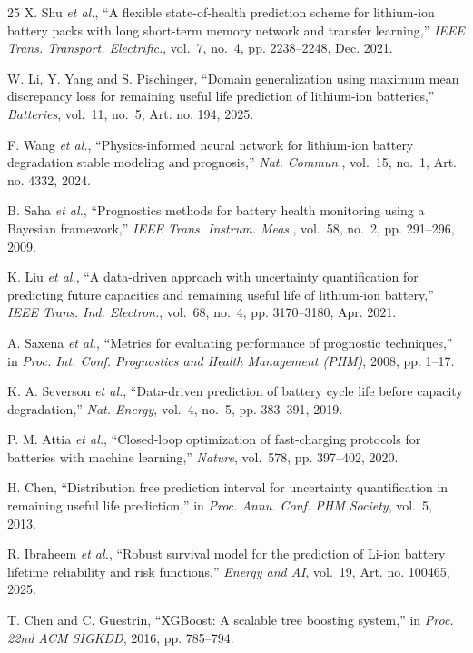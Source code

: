 \documentclass[conference,a4paper]{IEEEtran}
\begin{document}
\begin{thebibliography}{25}
 X. Shu \emph{et al.},
``A flexible state-of-health prediction scheme for lithium-ion battery packs
with long short-term memory network and transfer learning,'' \emph{IEEE
Trans. Transport. Electrific.}, vol.~7, no.~4, pp. 2238--2248, Dec. 2021.

 W. Li, Y. Yang and S. Pischinger, ``Domain generalization
using maximum mean discrepancy loss for remaining useful life prediction of
lithium-ion batteries,'' \emph{Batteries}, vol.~11, no.~5, Art. no. 194,
2025.

 F. Wang \emph{et al.},
``Physics-informed neural network for lithium-ion battery degradation stable
modeling and prognosis,'' \emph{Nat. Commun.}, vol.~15, no.~1,
Art. no. 4332, 2024.

 B. Saha \emph{et al.},
``Prognostics methods for battery health monitoring using a Bayesian
framework,'' \emph{IEEE Trans. Instrum. Meas.}, vol.~58, no.~2,
pp. 291--296, 2009.

 K. Liu \emph{et al.}, ``A
data-driven approach with uncertainty quantification for predicting future
capacities and remaining useful life of lithium-ion battery,'' \emph{IEEE
Trans. Ind. Electron.}, vol.~68, no.~4, pp. 3170--3180, Apr. 2021.

 A. Saxena \emph{et al.}, ``Metrics for evaluating performance of
prognostic techniques,'' in \emph{Proc. Int. Conf. Prognostics and Health
Management (PHM)}, 2008, pp. 1--17.

 K. A. Severson \emph{et al.}, ``Data-driven
prediction of battery cycle life before capacity degradation,'' \emph{Nat.
Energy}, vol.~4, no.~5, pp. 383--391, 2019.

 P. M. Attia \emph{et al.}, ``Closed-loop optimization of
fast-charging protocols for batteries with machine learning,''
\emph{Nature}, vol.~578, pp. 397--402, 2020.

 H. Chen, ``Distribution free prediction interval for
uncertainty quantification in remaining useful life prediction,'' in
\emph{Proc. Annu. Conf. PHM Society}, vol.~5, 2013.

 R. Ibraheem \emph{et al.},
``Robust survival model for the prediction of Li-ion battery lifetime
reliability and risk functions,'' \emph{Energy and AI}, vol.~19,
Art. no. 100465, 2025.

 T. Chen and C. Guestrin, ``XGBoost: A scalable tree
boosting system,'' in \emph{Proc. 22nd ACM SIGKDD}, 2016, pp. 785--794.


\end{thebibliography}
\end{document}
